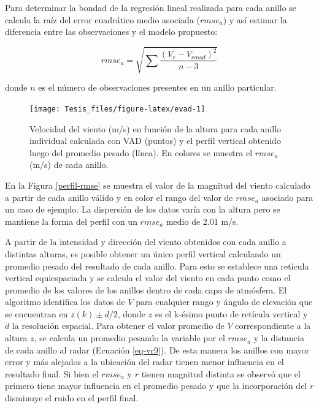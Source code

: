 \documentclass[12pt,spanish,oneside, a4paper]{book}
\begin{document}
Para determinar la bondad de la regresión lineal realizada para cada
anillo se calcula la raíz del error cuadrático medio asociada
(\(rmse_a\)) y así estimar la diferencia entre las observaciones y el
modelo propuesto:

\begin{equation}\label{eq-vr8}
rmse_a = \sqrt {\sum \frac {(V_r - V_{rmod} )^2} {n-3}}
\end{equation}

donde \(n\) es el número de observaciones presentes en un anillo
particular.

\begin{figure}

{\centering \texttt{[image: Tesis\_files/figure-latex/evad-1]} 

}

\caption{Velocidad del viento (m/s) en función de la altura para cada anillo individual calculada con VAD (puntos) y el perfil vertical obtenido luego del promedio pesado (línea). En colores se muestra el $rmse_a$ (m/s) de cada anillo. \label{perfil-rmse}}\label{fig:evad}
\end{figure}

En la Figura \ref{perfil-rmse} se muestra el valor de la magnitud del
viento calculado a partir de cada anillo válido y en color el rango del
valor de \(rmse_a\) asociado para un caso de ejemplo. La dispersión de
los datos varía con la altura pero se mantiene la forma del perfil con
un \(rmse_a\) medio de 2.01 m/s.

A partir de la intensidad y dirección del viento obtenidos con cada
anillo a distintas alturas, es posible obtener un único perfil vertical
calculando un promedio pesado del resultado de cada anillo. Para esto se
establece una retícula vertical equiespaciada y se calcula el valor del
viento en cada punto como el promedio de los valores de los anillos
dentro de cada capa de atmósfera. El algoritmo identifica los datos de
\(V\) para cualquier rango y ángulo de elevación que se encuentran en
\(z(k) \pm d/2\), donde \(z\) es el k-ésimo punto de retícula vertical y
\(d\) la resolución espacial. Para obtener el valor promedio de \(V\)
correspondiente a la altura \(z\), se calcula un promedio pesando la
variable por el \(rmse_a\) y la distancia de cada anillo al radar
(Ecuación \ref{eq-vr9}). De esta manera los anillos con mayor error y
más alejados a la ubicación del radar tienen menor influencia en el
resultado final. Si bien el \(rmse_a\) y \(r\) tienen magnitud distinta
se observó que el primero tiene mayor influencia en el promedio pesado y
que la incorporación del \(r\) disminuye el ruido en el perfil final.
\end{document}
